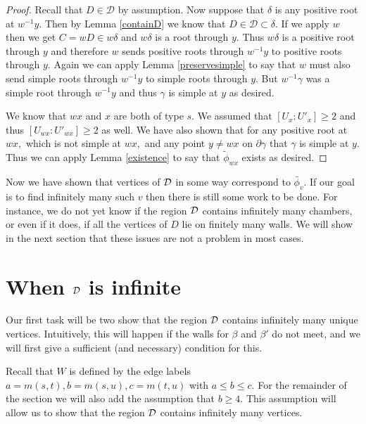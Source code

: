 \documentclass[class=book, crop=false,12 pt]{standalone}
\begin{document}
\begin{proof}
Recall that $D\in \mathcal{D}$ by assumption. Now suppose that $\delta$ is any positive root at $w^{-1}y.$ Then by Lemma \ref{containD} we know that $D\in \mathcal{D}\subset \delta.$ If we apply $w$ then we get $C=wD\in w\delta$ and $w\delta$ is a root through $y.$ Thus $w\delta$ is a positive root through $y$ and therefore $w$ sends positive roots through $w^{-1}y$ to positive roots through $y.$ Again we can apply Lemma \ref{preservesimple} to say that $w$ must also send simple roots through $w^{-1}y$ to simple roots through $y.$ But $w^{-1}\gamma$ was a simple root through $w^{-1}y$ and thus $\gamma$ is simple at $y$ as desired.

We know that $wx$ and $x$ are both of type $s.$ We assumed that $[U_x:U'_x]\ge 2$ and thus $[U_{wx}:U'_{wx}]\ge 2$ as well. We have also shown that for any positive root at $wx,$ which is not simple at $wx,$ and any point $y\neq wx$ on $\partial \gamma$ that $\gamma$ is simple at $y.$ Thus we can apply Lemma \ref{existence} to say that $\tilde{\phi}_{wx}$ exists as desired.
\end{proof}

Now we have shown that vertices of $\mathcal{D}$ in some way correspond to $\tilde{\phi_v}.$ If our goal is to find infinitely many such $v$ then there is still some work to be done. For instance, we do not yet know if the region $\mathcal{D}$ contains infinitely many chambers, or even if it does, if all the vertices of $D$ lie on finitely many walls. We will show in the next section that these issues are not a problem in most cases.


\section{When $\mathcal{D}$ is infinite}
Our first task will be two show that the region $\mathcal{D}$ contains infinitely many unique vertices. Intuitively, this will happen if the walls for $\beta$ and $\beta'$ do not meet, and we will first give a sufficient (and necessary) condition for this.

Recall that $W$ is defined by the edge labels $a=m(s,t),b=m(s,u),c=m(t,u)$ with $a\le b \le c.$ For the remainder of the section we will also add the assumption that $b\ge 4.$ This assumption will allow us to show that the region $\mathcal{D}$ contains infinitely many vertices.
\end{document}
